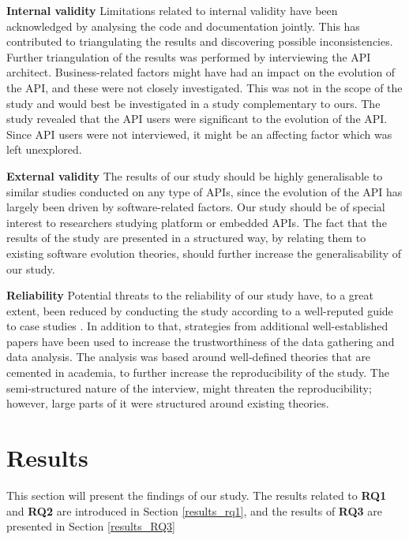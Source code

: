 \documentclass{sig-alternate}
\begin{document}
\smallskip \noindent
\textbf{Internal validity  } Limitations related to internal validity have been acknowledged by analysing the code and documentation jointly. This has contributed to triangulating the results and discovering possible inconsistencies. Further triangulation of the results was performed by interviewing the API architect. Business-related factors might have had an impact on the evolution of the API, and these were not closely investigated. This was not in the scope of the study and would best be investigated in a study complementary to ours. The study revealed that the API users were significant to the evolution of the API. Since API users were not interviewed, it might be an affecting factor which was left unexplored. 

\smallskip \noindent
\textbf{External validity  } The results of our study should be highly generalisable to similar studies conducted on any type of APIs, since the evolution of the API has largely been driven by software-related factors. Our study should be of special interest to researchers studying platform or embedded APIs. The fact that the results of the study are presented in a structured way, by relating them to existing software evolution theories, should further increase the generalisability of our study.

\smallskip \noindent
\textbf{Reliability  } Potential threats to the reliability of our study have, to a great extent, been reduced by conducting the study according to a well-reputed guide to case studies \cite{runeson2009guidelines}. In addition to that, strategies from additional well-established papers \cite{andersson2007spiral} \cite{seaman1999qualitative} \cite{robson2002real} have been used to increase the trustworthiness of the data gathering and data analysis. The analysis was based around well-defined theories that are cemented in academia, to further increase the reproducibility of the study. The semi-structured nature of the interview, might threaten the reproducibility; however, large parts of it were structured around existing theories. 

\newpage



\section{Results} \label{results} 
This section will present the findings of our study. The results related to \textbf{RQ1} and \textbf{RQ2} are introduced in Section \ref{results_rq1}, and the results of \textbf{RQ3} are presented in Section \ref{results_RQ3}
\end{document}
